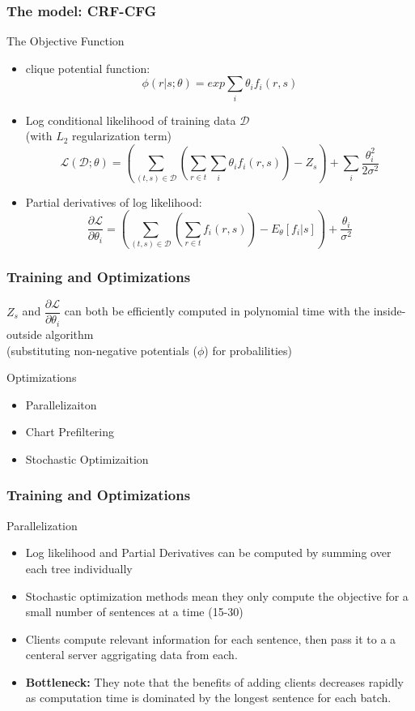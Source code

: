 \documentclass{beamer}
\begin{document}
\begin{frame}
  \frametitle{The model: CRF-CFG}
  \begin{block}{The Objective Function}
    \begin{itemize}
    \item clique potential function:
          $$\phi(r | s; \theta) = exp \sum_i \theta_i f_i(r, s)$$
    \item Log conditional likelihood of training data $\mathcal{D}$  \\
          (with $L_2$ regularization term)
          $$\mathcal{L}(\mathcal{D}; \theta) = (\sum_{(t, s) \in \mathcal{D}}(\sum_{r \in t} \sum_i
                               \theta_i f_i(r, s)) - Z_s) + \sum_i \dfrac{\theta_i^2}{2 \sigma^2}$$
    \item Partial derivatives of log likelihood:
          $$\dfrac{\partial \mathcal{L}}{\partial \theta_i} =
              (\sum_{(t, s) \in \mathcal{D}} (\sum_{r \in t} f_i(r, s)) - E_\theta [f_i | s]) +
              \dfrac{\theta_i}{\sigma^2}$$
    \end{itemize}
  \end{block}
\end{frame}

\begin{frame}
  \frametitle{Training and Optimizations}
  $Z_s$ and $\dfrac{\partial \mathcal{L}}{\partial \theta_i}$ can both be efficiently computed
  in polynomial time with the inside-outside algorithm  \\
  (substituting non-negative potentials ($\phi$) for probalilities)
  
  \begin{block}{Optimizations}
    \begin{itemize}
      \item Parallelizaiton
      \item Chart Prefiltering
      \item Stochastic Optimizaition
    \end{itemize}
  \end{block}
\end{frame}


\begin{frame}
  \frametitle{Training and Optimizations}
  \begin{block}{Parallelization}
    \begin{itemize}
      \item Log likelihood and Partial Derivatives can be computed by summing over each tree
            individually
      \item Stochastic optimization methods mean they only compute the objective for a small number
            of sentences at a time (15-30)
      \item Clients compute relevant information for each sentence, then pass it to a
            a centeral server aggrigating data from each.
      \item \textbf{Bottleneck:} They note that the benefits of adding clients decreases rapidly as
            computation time is dominated by the longest sentence for each batch.
    \end{itemize}
  \end{block}
\end{frame}
\end{document}
